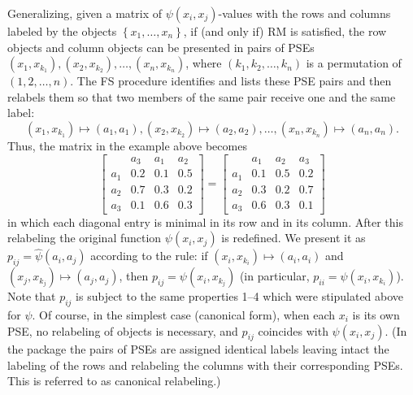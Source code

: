 \documentclass[nojss]{jss}
\begin{document}
Generalizing, given a matrix of $\psi\left(x_{i},x_{j}\right)$-values
with the rows and columns labeled by the objects $\left\{ x_{1},\ldots,x_{n}\right\}$,
if (and only if) RM is satisfied, the row objects and column objects
can be presented in pairs of PSEs $\left(x_{1},x_{k_{1}}\right),\left(x_{2},x_{k_{2}}\right),\ldots,\left(x_{n},x_{k_{n}}\right)$,
where $\left(k_{1},k_{2},\ldots,k_{n}\right)$ is a permutation of
$\left(1,2,\ldots,n\right)$. The FS procedure identifies and lists
these PSE pairs and then relabels them so that two members of the
same pair receive one and the same label: 
\[
\left(x_{1},x_{k_{1}}\right)\mapsto\left(a_{1},a_{1}\right),\left(x_{2},x_{k_{2}}\right)\mapsto\left(a_{2},a_{2}\right),\ldots,\left(x_{n},x_{k_{n}}\right)\mapsto\left(a_{n},a_{n}\right).
\]
Thus, the matrix in the example above becomes
\[
\left[\begin{array}{cccc}
 & a_{3} & a_{1} & a_{2}\\
a_{1} & 0.2 & 0.1 & 0.5\\
a_{2} & 0.7 & 0.3 & 0.2\\
a_{3} & 0.1 & 0.6 & 0.3\end{array}\right]=\left[\begin{array}{cccc}
 & a_{1} & a_{2} & a_{3}\\
a_{1} & 0.1 & 0.5 & 0.2\\
a_{2} & 0.3 & 0.2 & 0.7\\
a_{3} & 0.6 & 0.3 & 0.1\end{array}\right]
\]
in which each diagonal entry is minimal in its row and in its column.
After this relabeling the original function $\psi\left(x_{i},x_{j}\right)$
is redefined. We present it as $p_{ij}=\hat{\psi}(a_i,a_j)$ according to the rule: if
$\left(x_{i},x_{k_{i}}\right)\mapsto\left(a_{i},a_{i}\right)$ and
$\left(x_{j},x_{k_{j}}\right)\mapsto\left(a_{j},a_{j}\right)$, then
$p_{ij}=\psi\left(x_{i},x_{k_{j}}\right)$ (in particular, $p_{ii}=\psi\left(x_{i},x_{k_{i}}\right)$).
Note that $p_{ij}$ is subject to the same properties 1--4 which were
stipulated above for $\psi$. Of course, in the simplest case (canonical form), when
each $x_{i}$ is its own PSE, no relabeling of objects is necessary,
and $p_{ij}$ coincides with $\psi\left(x_{i},x_{j}\right)$. (In the package 
the pairs of PSEs are assigned identical labels leaving intact the labeling of the rows 
and relabeling the columns with their corresponding PSEs. 
This is referred to as canonical relabeling.)
\end{document}
